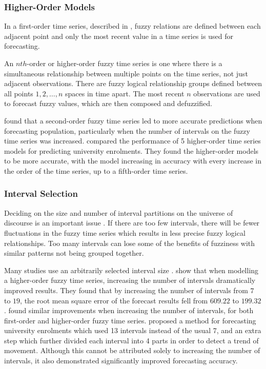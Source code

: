 \documentclass[12pt, oneside, a4paper]{article}
\theoremstyle{definition}
\begin{document}
\subsubsection{Higher-Order Models}

\label{higher}

In a first-order time series, described in , fuzzy relations are defined between each adjacent point and only the most recent value in a time series is used for forecasting.

An $nth$-order or higher-order fuzzy time series is one where there is a simultaneous relationship between multiple points on the time series, not just adjacent observations. There are fuzzy logical relationship groups defined between all points $1,2,\ldots,n$ spaces in time apart. The most recent $n$ observations are used to forecast fuzzy values, which are then composed and defuzzified.

\cite{tsai1999study} found that a second-order fuzzy time series led to more accurate predictions when forecasting population, particularly when the number of intervals on the fuzzy time series was increased. \cite{tsai2000forecasting} compared the performance of 5 higher-order time series models for predicting university enrolments. They found the higher-order models to be more accurate, with the model increasing in accuracy with every increase in the order of the time series, up to a fifth-order time series.

\subsubsection{Interval Selection}

\label{interval}

Deciding on the size and number of interval partitions on the universe of discourse is an important issue \citep{Huarng2001effective,  huarng2006ratio}. If there are too few intervals, there will be fewer fluctuations in the fuzzy time series \citep{Huarng2001effective} which results in less precise fuzzy logical relationships. Too many intervals can lose some of the benefits of fuzziness with similar patterns not being grouped together.

Many studies use an arbitrarily selected interval size \citep{song1993forecasting, song1994forecasting, chen1996forecasting, tsai2000forecasting, chen2004new}. \cite{tsai2000forecasting} show that when modelling a higher-order fuzzy time series, increasing the number of intervals dramatically improved results. They found that by increasing the number of intervals from $7$ to $19$, the root mean square error of the forecast results fell from $609.22$ to $199.32$. \cite{tsai1999study} found similar improvements when increasing the number of intervals, for both first-order and higher-order fuzzy time series. \cite{chen2004new} proposed a method for forecasting university enrolments which used 13 intervals instead of the usual 7, and an extra step which further divided each interval into 4 parts in order to detect a trend of movement. Although this cannot be attributed solely to increasing the number of intervals, it also demonstrated significantly improved forecasting accuracy. 	
\end{document}
